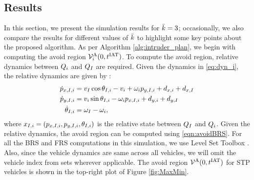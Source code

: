 \subsection{Results \label{sec:simResults}}
In this section, we present the simulation results for $\bar{k} = 3$; occasionally, we also compare the results for different values of $\bar{k}$ to highlight some key points about the proposed algorithm. As per Algorithm \ref{alg:intruder_plan}, we begin with computing the avoid region $\mathcal{V}^{\text{A}}_{i}(0, t^\text{IAT})$. To compute the avoid region, relative dynamics between $Q_i$ and $Q_{I}$ are required. Given the dynamics in \eqref{eq:dyn_i}, the relative dynamics are given by \cite{Mitchell05}:
\begin{equation}
\label{eq:reldyn_i}
\begin{aligned}
\dot{\pos}_{x, \intr, i} &= v_{\intr} \cos \theta_{\intr, i} - v_i + \omega_i {\pos}_{y, \intr, i} + d_{x,i} + d_{x,\intr}\\
\dot{\pos}_{y, \intr, i} &= v_i \sin \theta_{\intr, i} - \omega_i {\pos}_{x, \intr, i} + d_{y,i} + d_{y,\intr}\\
\dot{\theta}_{\intr, i} &= \omega_{\intr} - \omega_i,
\end{aligned}
\end{equation}    
where $x_{I, i} = (p_{x, I, i}, p_{y, I, i}, \theta_{I, i})$ is the relative state between $Q_{I}$ and $Q_i$. Given the relative dynamics, the avoid region can be computed using \eqref{eqn:avoidBRS}. For all the BRS and FRS computations in this simulation, we use Level Set Toolbox \cite{Mitchell07b}. Also, since the vehicle dynamics are same across all vehicles, we will omit the vehicle index from sets wherever applicable. The avoid region $\mathcal{V}^{\text{A}}(0, t^\text{IAT})$ for STP vehicles is shown in the top-right plot of Figure \ref{fig:MaxMin}.

